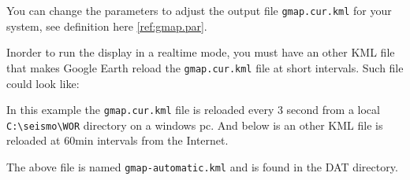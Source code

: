You can change the parameters to adjust the output file \texttt{gmap.cur.kml} for your system, see definition here \ref{ref:gmap.par}.

Inorder to run the display in a realtime mode, you must have an other KML file that makes Google Earth reload the \texttt{gmap.cur.kml} file at short intervals.
Such file could look like:

\begin{small}

\end{small}

In this example the \texttt{gmap.cur.kml} file is reloaded every 3 second from a local 
\texttt{C:\textbackslash seismo\textbackslash WOR} directory on a windows pc. 
And below is an other KML file is reloaded at 60min intervals from the Internet.

The above file is named \texttt{gmap-automatic.kml} and is found in the DAT directory.

